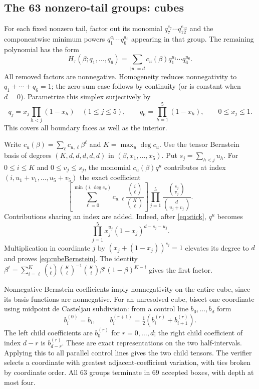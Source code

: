 \documentclass[11pt]{article}
\begin{document}
\subsection{The 63 nonzero-tail groups: cubes}

For each fixed nonzero tail, factor out its monomial
$q_7^{e_7}\cdots q_{12}^{e_{12}}$ and the componentwise minimum powers
$q_1^{a_1}\cdots q_6^{a_6}$ appearing in that group. The remaining polynomial
has the form
\[
H_\tau(\beta;q_1,\ldots,q_6)=
\sum_{|u|=d}c_u(\beta)q_1^{u_1}\cdots q_6^{u_6}.
\]
All removed factors are nonnegative. Homogeneity reduces nonnegativity to
$q_1+\cdots+q_6=1$; the zero-sum case follows by continuity (or is constant
when $d=0$). Parametrize this simplex surjectively by
\begin{equation}\label{eq:stick}
q_j=x_j\prod_{h<j}(1-x_h)\quad(1\le j\le5),\qquad
q_6=\prod_{h=1}^5(1-x_h),\qquad 0\le x_j\le1.
\end{equation}
This covers all boundary faces as well as the interior.

Write $c_u(\beta)=\sum_\ell c_{u,\ell}\beta^\ell$ and
$K=\max_u\deg c_u$. Use the tensor Bernstein basis of degrees
$(K,d,d,d,d,d)$ in $(\beta,x_1,\ldots,x_5)$. Put
$s_j=\sum_{h<j}u_h$. For $0\le i\le K$ and $0\le v_j\le s_j$, the monomial
$c_u(\beta)q^u$ contributes at index $(i,u_1+v_1,\ldots,u_5+v_5)$ the exact
coefficient
\begin{equation}\label{eq:cubeBernstein}
\left[\sum_{\ell=0}^{\min(i,\deg c_u)}
 c_{u,\ell}\frac{\binom i\ell}{\binom K\ell}\right]
\prod_{j=1}^5\frac{\binom{s_j}{v_j}}{\binom d{u_j+v_j}}.
\end{equation}
Contributions sharing an index are added. Indeed, after \eqref{eq:stick},
$q^u$ becomes
\[
\prod_{j=1}^5 x_j^{u_j}(1-x_j)^{d-s_j-u_j}.
\]
Multiplication in coordinate $j$ by
$(x_j+(1-x_j))^{s_j}=1$ elevates its degree to $d$ and proves
\eqref{eq:cubeBernstein}. The identity
$\beta^\ell=\sum_{i=\ell}^K\binom i\ell\binom K\ell^{-1}
\binom Ki\beta^i(1-\beta)^{K-i}$ gives the first factor.

Nonnegative Bernstein coefficients imply nonnegativity on the entire cube,
since its basis functions are nonnegative. For an unresolved cube, bisect one
coordinate using midpoint de Casteljau subdivision: from a control line
$b_0,\ldots,b_d$ form
\begin{equation}\label{eq:decasteljau}
b_i^{(0)}=b_i,\qquad
b_i^{(r+1)}=\tfrac12(b_i^{(r)}+b_{i+1}^{(r)}).
\end{equation}
The left child coefficients are $b_0^{(r)}$ for $r=0,\ldots,d$; the right
child coefficient of index $d-r$ is $b_{d-r}^{(r)}$. These are exact
representations on the two half-intervals. Applying this to all parallel
control lines gives the two child tensors. The verifier selects a coordinate
with greatest adjacent-coefficient variation, with ties broken by coordinate
order. All 63 groups terminate in 69 accepted boxes, with depth at most four.
\end{document}
